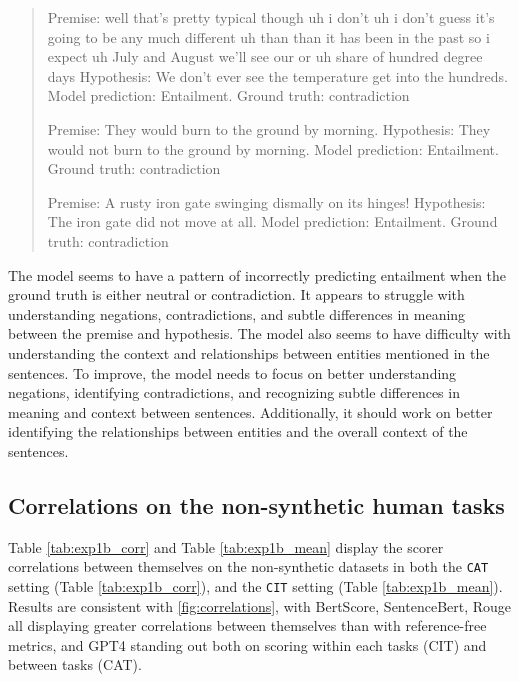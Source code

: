 \begin{quote}
Premise:
well that's pretty typical though uh i don't uh i don't guess it's going to be any much different uh than than it has been in the past so i expect uh July and August we'll see our  or uh share of hundred degree days
Hypothesis:
We don't ever see the temperature get into the hundreds.
Model prediction: Entailment.
Ground truth: contradiction


Premise:
They would burn to the ground by morning.
Hypothesis:
They would not burn to the ground by morning.
Model prediction: Entailment.
Ground truth: contradiction


Premise:
A rusty iron gate swinging dismally on its hinges! 
Hypothesis:
The iron gate did not move at all.  
Model prediction: Entailment.
Ground truth: contradiction


\end{quote}


The model seems to have a pattern of incorrectly predicting entailment when the ground truth is either neutral or contradiction. It appears to struggle with understanding negations, contradictions, and subtle differences in meaning between the premise and hypothesis. The model also seems to have difficulty with understanding the context and relationships between entities mentioned in the sentences.
To improve, the model needs to focus on better understanding negations, identifying contradictions, and recognizing subtle differences in meaning and context between sentences. Additionally, it should work on better identifying the relationships between entities and the overall context of the sentences.


\subsection{Correlations on the non-synthetic human tasks}

Table \ref{tab:exp1b_corr} and Table \ref{tab:exp1b_mean} display the scorer correlations between themselves on the non-synthetic datasets in both the \texttt{CAT} setting (Table \ref{tab:exp1b_corr}), and the \texttt{CIT} setting (Table \ref{tab:exp1b_mean}). Results are consistent with \autoref{fig:correlations}, with BertScore, SentenceBert, Rouge all displaying greater correlations between themselves than with reference-free metrics, and GPT4 standing out both on scoring within each tasks (CIT) and between tasks (CAT).


